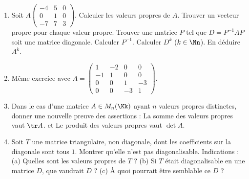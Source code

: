 \documentclass[11pt, class=report,crop=false]{standalone}
\begin{document}
\begin{miniexercices}
\sauteligne
\begin{enumerate}
  \item 
  Soit $A\left(\begin{smallmatrix}
-4 & 5 & 0 \\
0 & 1 & 0 \\
-7 & 7 & 3  
\end{smallmatrix}\right)$. Calculer les valeurs propres de $A$. Trouver un vecteur propre pour chaque valeur propre. Trouver une matrice $P$ tel que $D = P^{-1} A P$ soit une matrice diagonale. Calculer $P^{-1}$. Calculer $D^k$ ($k\in\Nn$). En déduire $A^k$.
  
  \item Même exercice avec $A = \left(\begin{smallmatrix}
  1 & -2 & 0 & 0 \\
-1 & 1 & 0 & 0 \\
0 & 0 & 1 & -3 \\
0 & 0 & -3 & 1
 \end{smallmatrix}\right)$.
 
  \item Dans le cas d'une matrice $A \in M_n(\Kk)$ ayant $n$ valeurs propres distinctes, donner une nouvelle preuve des assertions : \og{}La somme des valeurs propres vaut $\tr A$.\fg{}
  et \og{}Le produit des valeurs propres vaut $\det A$.\fg{}
  
  \item Soit $T$ une matrice triangulaire, non diagonale, dont les coefficients sur la diagonale sont tous $1$. Montrer qu'elle n'est pas diagonalisable. Indications : (a) Quelles sont les valeurs propres de $T$ ? (b) Si $T$ était diagonalisable en une matrice $D$, que vaudrait $D$ ? (c) \`A quoi pourrait être semblable ce $D$ ? 
\end{enumerate}
\end{miniexercices}





\finchapitre 
\end{document}
